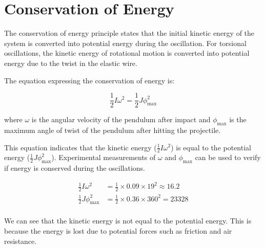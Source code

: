 \section{Conservation of Energy}

The conservation of energy principle states that the initial kinetic energy of the system is converted into potential energy during the oscillation. For torsional oscillations, the kinetic energy of rotational motion is converted into potential energy due to the twist in the elastic wire.

\bigbreak{}

The equation expressing the conservation of energy is:

\[ \frac{1}{2}I\omega^2 = \frac{1}{2}J\phi_{\max}^2 \]

\noindent where $\omega$ is the angular velocity of the pendulum after impact and $\phi_{\max}$ is the maximum angle of twist of the pendulum after hitting the projectile.

\bigbreak{}

This equation indicates that the kinetic energy ($\frac{1}{2}I\omega^2$) is equal to the potential energy ($\frac{1}{2}J\phi_{\max}^2$). Experimental measurements of $\omega$ and $\phi_{\max}$ can be used to verify if energy is conserved during the oscillations.

\begin{align*}
    \frac{1}{2}I\omega^2 &= \frac{1}{2}\times0.09\times19^2 \approx 16.2 \\
    \frac{1}{2}J\phi_{\max}^2 &= \frac{1}{2}\times0.36\times360^2 = 23328\\
\end{align*}

\noindent We can see that the kinetic energy is not equal to the potential energy. This is because the energy is lost due to potential forces such as friction and air resistance.
